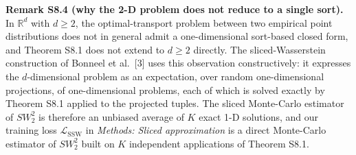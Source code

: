 \documentclass[
  11pt,
  a4paper,
]{article}
\begin{document}
\textbf{Remark S8.4 (why the 2-D problem does not reduce to a single sort).}
In \(\mathbb{R}^{d}\) with \(d \geq 2\), the optimal-transport problem
between two empirical point distributions does not in general admit
a one-dimensional sort-based closed form, and Theorem S8.1 does not
extend to \(d \geq 2\) directly. The sliced-Wasserstein construction
of Bonneel et al.~{[}3{]} uses this observation constructively: it
expresses the \(d\)-dimensional problem as an expectation, over
random one-dimensional projections, of one-dimensional problems,
each of which is solved exactly by Theorem S8.1 applied to the
projected tuples. The sliced Monte-Carlo estimator of \(SW_{2}^{2}\)
is therefore an unbiased average of \(K\) exact 1-D solutions, and
our training loss \(\mathcal{L}_{\mathrm{SSW}}\) in \emph{Methods:
Sliced approximation} is a direct Monte-Carlo estimator of \(SW_{2}^{2}\)
built on \(K\) independent applications of Theorem S8.1.
\end{document}
